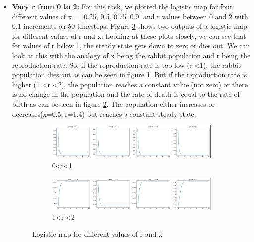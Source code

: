 \begin{itemize}
    \item \textbf{Vary r from 0 to 2:} For this task, we plotted the logistic map for four different values of x = [0.25, 0.5, 0.75, 0.9] and r values between 0 and 2 with 0.1 increments on 50 timesteps. Figure \ref{fig:Logistic_map_0_2} shows two outputs of a logistic map for different values of r and x. Looking at these plots closely, we can see that for values of r below 1, the steady state gets down to zero or dies out. We can look at this with the analogy of x being the rabbit population and r being the reproduction rate. So, if the reproduction rate is too low (r \textless 1), the rabbit population dies out as can be seen in figure \ref{fig:r_0_1}. But if the reproduction rate is higher (1 \textless r \textless 2), the population reaches a constant value (not zero) or there is no change in the population and the rate of death is equal to the rate of birth as can be seen in figure \ref{fig:r_0_2}. The population either increases or decreases(x=0.5, r=1.4) but reaches a constant steady state.

\begin{figure}[H]
    \centering
    \begin{subfigure}[b]{\textwidth}
        \centering
        \includegraphics[width=\textwidth]{images/ex4task4_r_0_1.png}
        \caption{0\textless r\textless 1}
        \label{fig:r_0_1}
    \end{subfigure}
    \hfill
    \begin{subfigure}[b]{\textwidth}
        \centering
        \includegraphics[width=\textwidth]{images/ex4task4_r_1_2.png}
        \caption{1\textless r \textless2}
        \label{fig:r_0_2}
    \end{subfigure}
    \caption{Logistic map for different values of r and x}
    \label{fig:Logistic_map_0_2}
\end{figure}


\end{itemize}

